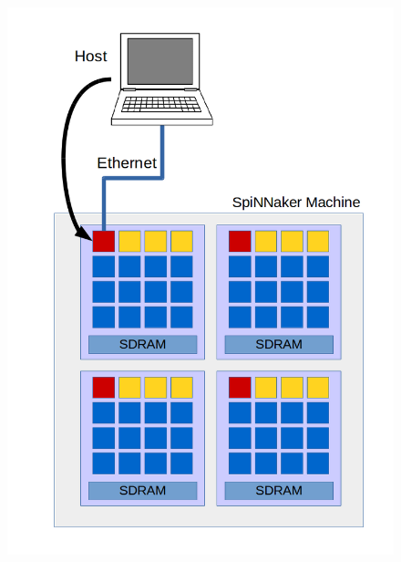 \begin{figure}
\centering
\begin{minipage}{.32\textwidth}
  \centering
  \includegraphics[width=1\linewidth, natwidth=794, natheight=1123]{images/put1.png}
  \label{fig:host-root}
\end{minipage}
\begin{minipage}{.32\textwidth}
  \centering

\end{minipage}
\end{figure}
